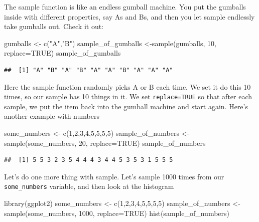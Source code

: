 \documentclass[
]{book}
\newenvironment{Shaded}{\begin{snugshade}}{\end{snugshade}}
\newcommand{\AttributeTok}[1]{\textcolor[rgb]{0.77,0.63,0.00}{#1}}
\newcommand{\ConstantTok}[1]{\textcolor[rgb]{0.00,0.00,0.00}{#1}}
\newcommand{\DecValTok}[1]{\textcolor[rgb]{0.00,0.00,0.81}{#1}}
\newcommand{\FunctionTok}[1]{\textcolor[rgb]{0.00,0.00,0.00}{#1}}
\newcommand{\NormalTok}[1]{#1}
\newcommand{\OtherTok}[1]{\textcolor[rgb]{0.56,0.35,0.01}{#1}}
\newcommand{\StringTok}[1]{\textcolor[rgb]{0.31,0.60,0.02}{#1}}
\begin{document}
The sample function is like an endless gumball machine. You put the gumballs inside with different properties, say As and Bs, and then you let sample endlessly take gumballs out. Check it out:

\begin{Shaded}
\begin{Highlighting}[]
\NormalTok{gumballs }\OtherTok{\textless{}{-}} \FunctionTok{c}\NormalTok{(}\StringTok{"A"}\NormalTok{,}\StringTok{"B"}\NormalTok{)}
\NormalTok{sample\_of\_gumballs }\OtherTok{\textless{}{-}}\FunctionTok{sample}\NormalTok{(gumballs, }\DecValTok{10}\NormalTok{, }\AttributeTok{replace=}\ConstantTok{TRUE}\NormalTok{)}
\NormalTok{sample\_of\_gumballs}
\end{Highlighting}
\end{Shaded}

\begin{verbatim}
##  [1] "A" "B" "A" "B" "A" "A" "B" "A" "A" "A"
\end{verbatim}

Here the sample function randomly picks A or B each time. We set it do this 10 times, so our sample has 10 things in it. We set \texttt{replace=TRUE} so that after each sample, we put the item back into the gumball machine and start again. Here's another example with numbers

\begin{Shaded}
\begin{Highlighting}[]
\NormalTok{some\_numbers }\OtherTok{\textless{}{-}} \FunctionTok{c}\NormalTok{(}\DecValTok{1}\NormalTok{,}\DecValTok{2}\NormalTok{,}\DecValTok{3}\NormalTok{,}\DecValTok{4}\NormalTok{,}\DecValTok{5}\NormalTok{,}\DecValTok{5}\NormalTok{,}\DecValTok{5}\NormalTok{,}\DecValTok{5}\NormalTok{)}
\NormalTok{sample\_of\_numbers }\OtherTok{\textless{}{-}}\FunctionTok{sample}\NormalTok{(some\_numbers, }\DecValTok{20}\NormalTok{, }\AttributeTok{replace=}\ConstantTok{TRUE}\NormalTok{)}
\NormalTok{sample\_of\_numbers}
\end{Highlighting}
\end{Shaded}

\begin{verbatim}
##  [1] 5 5 3 2 3 5 4 4 4 3 4 4 5 3 5 3 1 5 5 5
\end{verbatim}

Let's do one more thing with sample. Let's sample 1000 times from our \texttt{some\_numbers} variable, and then look at the histogram

\begin{Shaded}
\begin{Highlighting}[]
\FunctionTok{library}\NormalTok{(ggplot2)}
\NormalTok{some\_numbers }\OtherTok{\textless{}{-}} \FunctionTok{c}\NormalTok{(}\DecValTok{1}\NormalTok{,}\DecValTok{2}\NormalTok{,}\DecValTok{3}\NormalTok{,}\DecValTok{4}\NormalTok{,}\DecValTok{5}\NormalTok{,}\DecValTok{5}\NormalTok{,}\DecValTok{5}\NormalTok{,}\DecValTok{5}\NormalTok{)}
\NormalTok{sample\_of\_numbers }\OtherTok{\textless{}{-}}\FunctionTok{sample}\NormalTok{(some\_numbers, }\DecValTok{1000}\NormalTok{, }\AttributeTok{replace=}\ConstantTok{TRUE}\NormalTok{)}
\FunctionTok{hist}\NormalTok{(sample\_of\_numbers)}
\end{Highlighting}
\end{Shaded}
\end{document}
